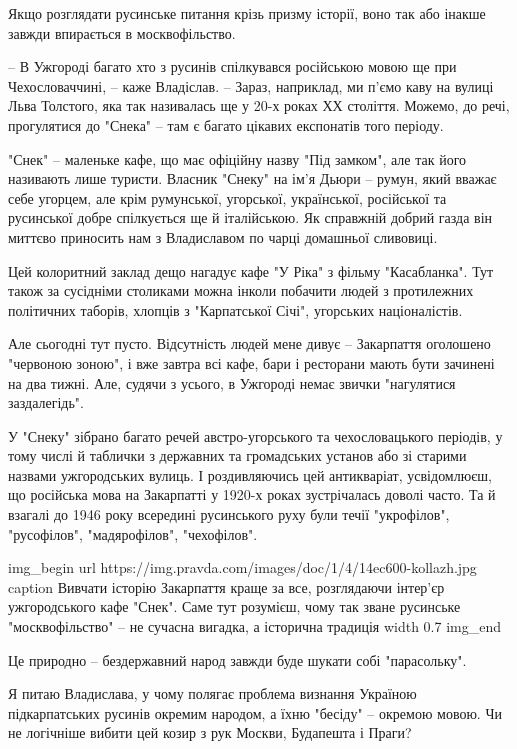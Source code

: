 Якщо розглядати русинське питання крізь призму історії, воно так або інакше
завжди впирається в москвофільство.

– В Ужгороді багато хто з русинів спілкувався російською мовою ще при
Чехословаччині, – каже Владіслав. – Зараз, наприклад, ми п’ємо каву на вулиці
Льва Толстого, яка так називалась ще у 20-х роках ХХ століття. Можемо, до речі,
прогулятися до "Снека" – там є багато цікавих експонатів того періоду.

"Снек" – маленьке кафе, що має офіційну назву "Під замком", але так його
називають лише туристи. Власник "Снеку" на ім’я Дьюри – румун, який вважає себе
угорцем, але крім румунської, угорської, української, російської та русинської
добре спілкується ще й італійською. Як справжній добрий газда він миттєво
приносить нам з Владиславом по чарці домашньої сливовиці.

Цей колоритний заклад дещо нагадує кафе "У Ріка" з фільму "Касабланка". Тут
також за сусідніми столиками можна інколи побачити людей з протилежних
політичних таборів, хлопців з "Карпатської Січі", угорських націоналістів.

Але сьогодні тут пусто. Відсутність людей мене дивує – Закарпаття оголошено
"червоною зоною", і вже завтра всі кафе, бари і ресторани мають бути зачинені
на два тижні. Але, судячи з усього, в Ужгороді немає звички "нагулятися
заздалегідь".

У "Снеку" зібрано багато речей австро-угорського та чехословацького періодів, у
тому числі й таблички з державних та громадських установ або зі старими назвами
ужгородських вулиць. І роздивляючись цей антикваріат, усвідомлюєш, що російська
мова на Закарпатті у 1920-х роках зустрічалась доволі часто. Та й взагалі до
1946 року всередині русинського руху були течії "укрофілов", "русофілов",
"мадярофілов", "чехофілов".

\ifcmt
img_begin 
        url https://img.pravda.com/images/doc/1/4/14ec600-kollazh.jpg
        caption Вивчати історію Закарпаття краще за все, розглядаючи інтер'єр ужгородського кафе "Снек". Саме тут розумієш, чому так зване русинське "москвофільство" – не сучасна вигадка, а історична традиція
        width 0.7
img_end
\fi

Це природно – бездержавний народ завжди буде шукати собі "парасольку".

Я питаю Владислава, у чому полягає проблема визнання Україною підкарпатських
русинів окремим народом, а їхню "бесіду" – окремою мовою. Чи не логічніше
вибити цей козир з рук Москви, Будапешта і Праги?

